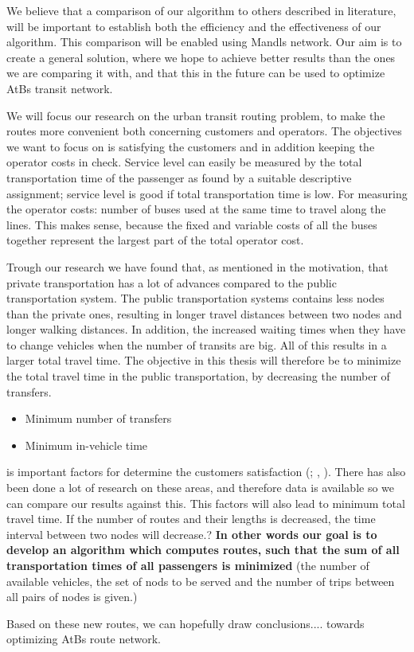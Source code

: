 We believe that a comparison of our algorithm to others described in literature, will be important to establish both the efficiency and the effectiveness of our algorithm. This comparison will be enabled using Mandls network. Our aim is to create a general solution, where we hope to achieve better results than the ones we are comparing it with, and that this in the future can be used to optimize AtBs transit network. 

We will focus our research on the urban transit routing problem, to make the routes more convenient both concerning customers and operators. The objectives we want to focus on is satisfying the customers and in addition keeping the operator costs in check. Service level can easily be measured by the total transportation time of the passenger as found by a suitable descriptive assignment; service level is good if total transportation time is low. For measuring the operator costs: number of buses used at the same time to travel along the lines. This makes sense, because the fixed and variable costs of all the buses together represent the largest part of the total operator cost. %

Trough our research we have found that, as mentioned in the motivation, that private transportation has a lot of advances compared to the public transportation system. The public transportation systems contains less nodes than the private ones, resulting in longer travel distances between two nodes and longer walking distances. In addition, the increased waiting times when they have to change vehicles when the number of transits are big. All of this results in a larger total travel time. The objective in this thesis will therefore be to minimize the total travel time in the public transportation, by decreasing the number of transfers. \citep{mandl79} 
\begin{itemize}
\item Minimum number of transfers
\item Minimum in-vehicle time
\end{itemize}
is important factors for determine the customers satisfaction ({\citet{kechagiopoulos14}; \citet{dias14}, \citet{yang07} }). There has also been done a lot of research on these areas, and therefore data is available so we can compare our results against this. This factors will also lead to minimum total travel time. 
If the number of routes and their lengths is decreased, the time interval between two nodes will decrease.?
\textbf{In other words our goal is to develop an algorithm which computes routes, such that the sum of all transportation times of all passengers is minimized}  (the number of available vehicles, the set of nods to be served and the number of trips between all pairs of nodes is given.) %

\par
Based on these new routes, we can hopefully draw conclusions.... towards optimizing AtBs route network.
